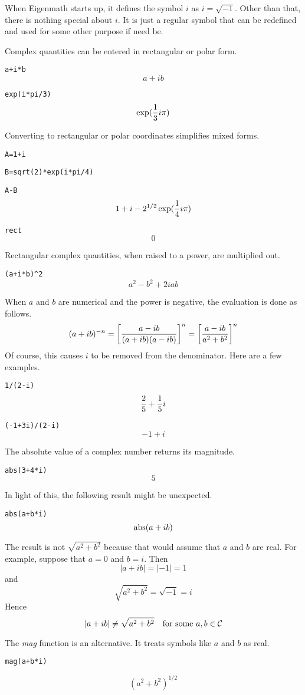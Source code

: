 
\newpage


\noindent
When Eigenmath starts up, it defines the symbol $i$ as $i=\sqrt{-1}$.
Other than that, there is nothing special about $i$.
It is just a regular symbol that can be redefined and used for some other purpose if need be.

\medskip
\noindent
Complex quantities can be entered in rectangular or polar form.

\medskip
\verb$a+i*b$
$$a+ib$$

\verb$exp(i*pi/3)$
$$\exp({1\over3}i\pi)$$

\medskip
\noindent
Converting to rectangular or polar coordinates simplifies mixed forms.

\medskip
\verb$A=1+i$

\verb$B=sqrt(2)*exp(i*pi/4)$

\verb$A-B$
$$1+i-2^{1/2}\exp({1\over4}i\pi)$$

\verb$rect$
$$0$$

\medskip
\noindent
Rectangular complex quantities, when raised to a power, are multiplied out.

\medskip
\verb$(a+i*b)^2$
$$a^2-b^2+2iab$$

\medskip
\noindent
When $a$ and $b$ are numerical and the power is negative, the evaluation is done as follows.
$$(a+ib)^{-n}=\left[{a-ib\over(a+ib)(a-ib)}\right]^n=\left[{a-ib\over a^2+b^2}\right]^n$$
Of course, this causes $i$ to be removed from the denominator.
Here are a few examples.

\medskip
\verb$1/(2-i)$
$${2\over5}+{1\over5}i$$

\verb$(-1+3i)/(2-i)$
$$-1+i$$

\newpage

\noindent
The absolute value of a complex number returns its magnitude.

\medskip
\verb$abs(3+4*i)$
$$5$$

\medskip
\noindent
In light of this, the following result might be unexpected.

\medskip
\verb$abs(a+b*i)$
$$\mathop{\rm abs}(a+ib)$$

\medskip
\noindent
The result is not $\sqrt{a^2+b^2}$ because that would assume that
$a$ and $b$ are real.
For example, suppose that $a=0$ and $b=i$.
Then
$$|a+ib|=|-1|=1$$
and
$$\sqrt{a^2+b^2}=\sqrt{-1}=i$$
Hence
$$|a+ib|\ne\sqrt{a^2+b^2}\quad\hbox{for some $a,b\in\cal C$}$$

\medskip
\noindent
The {\it mag} function is an alternative.
It treats symbols like $a$ and $b$ as real.

\medskip
\verb$mag(a+b*i)$

$$(a^2+b^2)^{1/2}$$


